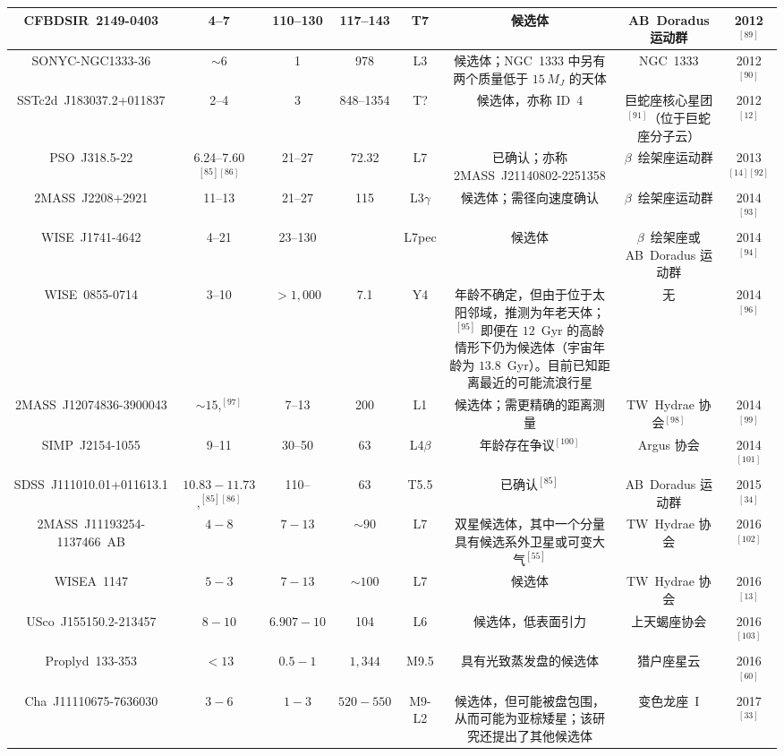 \begin{table}[ht]
\begin{tabular}{|c|c|c|c|c|c|c|c|}
\hline
CFBDSIR~2149-0403 & 4--7 & 110--130 & 117--143 & T7 & 候选体 & AB~Doradus 运动群 & 2012$^{[89]}$\\
\hline
SONYC-NGC1333-36 & $\sim6$ & 1 & 978 & L3 & 候选体；NGC~1333 中另有两个质量低于 $15\,M_J$ 的天体 & NGC~1333 & 2012$^{[90]}$\\
\hline
SSTc2d~J183037.2+011837 & 2--4 & 3 & 848--1354 & T? & 候选体，亦称 ID~4  & 巨蛇座核心星团$^{[91]}$（位于巨蛇座分子云） & 2012$^{[12]}$\\
\hline
PSO~J318.5-22 & 6.24--7.60$^{[85][86]}$ & 21--27 & 72.32 & L7 & 已确认；亦称 2MASS~J21140802-2251358 & $\beta$~绘架座运动群 & 2013$^{[14][92]}$\\
\hline
2MASS~J2208+2921 & 11--13  & 21--27 & 115 & L3$\gamma$ & 候选体；需径向速度确认 & $\beta$~绘架座运动群 & 2014$^{[93]}$\\
\hline
WISE~J1741-4642 & 4--21 & 23--130 &  & L7pec  & 候选体  & $\beta$~绘架座或 AB~Doradus 运动群 & 2014$^{[94]}$\\
\hline
WISE~0855-0714 & 3--10 & $>1{,}000$ & 7.1 & Y4 & 年龄不确定，但由于位于太阳邻域，推测为年老天体；$^{[95]}$ 即便在 $12$~Gyr 的高龄情形下仍为候选体（宇宙年龄为 $13.8$~Gyr）。目前已知距离最近的可能流浪行星 & 无 & 2014$^{[96]}$\\
\hline
2MASS~J12074836-3900043 & $\sim15$,$^{[97]}$ & 7--13 & 200 & L1 & 候选体；需更精确的距离测量 & TW~Hydrae 协会$^{[98]}$ & 2014$^{[99]}$\\
\hline
SIMP~J2154-1055 & 9--11 & 30--50 & 63 & L4$\beta$ & 年龄存在争议$^{[100]}$ & Argus 协会 & 2014$^{[101]}$\\
\hline
SDSS~J111010.01+011613.1 & $10.83-11.73$,$^{[85][86]}$ & 110-- & 63 & T5.5 & 已确认$^{[85]}$ & AB~Doradus 运动群 & 2015$^{[34]}$\\
\hline
2MASS~J11193254-1137466~AB & $4-8$ & $7-13$ & $\sim90$ & L7 & 双星候选体，其中一个分量具有候选系外卫星或可变大气$^{[55]}$ & TW~Hydrae 协会 & 2016$^{[102]}$\\
\hline
WISEA~1147 & $5-3 $& $7-13$ & $\sim100$ & L7 & 候选体 & TW~Hydrae 协会  & 2016$^{[13]}$\\
\hline
USco~J155150.2-213457 & $8-10$ & $6.907-10$ & 104 & L6 & 候选体，低表面引力 &上天蝎座协会 & 2016$^{[103]}$\\
\hline
Proplyd~133-353 & $<13$ & $0.5-1$ & $1{,}344$ & M9.5 & 具有光致蒸发盘的候选体 & 猎户座星云 & 2016$^{[60]}$\\
\hline
Cha~J11110675-7636030 & $3-6$ & $1-3$ & $520-550$  & M9-L2 & 候选体，但可能被盘包围，从而可能为亚棕矮星；该研究还提出了其他候选体 & 变色龙座~I & 2017$^{[33]}$\\

\end{tabular}
\end{table}
